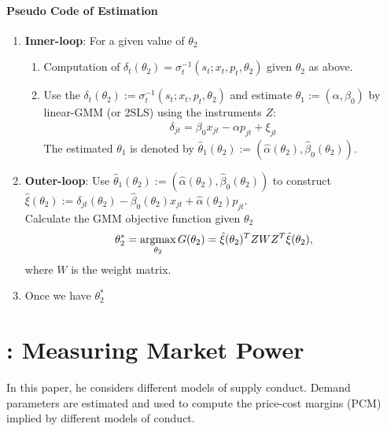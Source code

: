 \documentclass[11pt]{elegantbook}
\newcommand{\argmax}{\operatornamewithlimits{argmax}}
\begin{document}
\paragraph*{Pseudo Code of Estimation}
\begin{enumerate}
    \item \textbf{Inner-loop}: For a given value of $\theta_2$
    \begin{enumerate}
        \item Computation of $\delta_t(\theta_2)=\sigma_{t}^{-1}\left(s_t; x_t,p_t,\theta_2\right)$ given $\theta_2$ as above.
        \item Use the $\delta_t(\theta_2):=\sigma_{t}^{-1}\left(s_t; x_t,p_t,\theta_2\right)$ and estimate $\theta_1:=(\alpha,\beta_0)$ by linear-GMM (or 2SLS) using the instruments $Z$:
        \begin{equation}
            \begin{aligned}
                \delta_{jt}=\beta_0 x_{jt} - \alpha p_{jt} + \xi_{jt}
            \end{aligned}
            \nonumber
        \end{equation}
        The estimated $\theta_1$ is denoted by $\hat{\theta}_1(\theta_2):=(\hat{\alpha}(\theta_2),\hat{\beta}_0(\theta_2))$.
    \end{enumerate}
    \item \textbf{Outer-loop}: Use $\hat{\theta}_1(\theta_2):=(\hat{\alpha}(\theta_2),\hat{\beta}_0(\theta_2))$ to construct $\hat{\xi}(\theta_2):=\delta_{jt}(\theta_2)-\hat{\beta}_0(\theta_2) x_{jt} + \hat{\alpha}(\theta_2) p_{jt}$.\\
    Calculate the GMM objective function given $\theta_2$
    \begin{equation}
        \begin{aligned}
            \theta_2^*=\argmax_{\theta_2}G(\theta_2)=\hat{\xi}(\theta_2)^T Z W Z^T \hat{\xi}(\theta_2),
        \end{aligned}
        \nonumber
    \end{equation}
    where $W$ is the weight matrix.
    \item Once we have $\theta_2^*$
\end{enumerate}

\section{\cite{nevo2001measuring}: Measuring Market Power}
In this paper, he considers different models of supply conduct.  Demand parameters are estimated and used to compute the price-cost margins (PCM) implied by different models of conduct.
\end{document}
